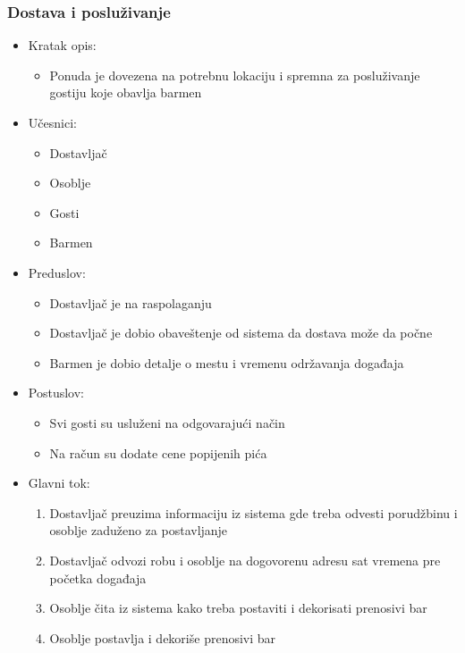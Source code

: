 \documentclass[a4paper]{article}
\begin{document}
\subsubsection{Dostava i posluživanje}

\begin{itemize}
    \item Kratak opis:
        \begin{itemize}
            \item Ponuda je dovezena na potrebnu lokaciju i spremna za posluživanje gostiju koje obavlja barmen
        \end{itemize}
    \item Učesnici:
        \begin{itemize}
            \item Dostavljač
            \item Osoblje
            \item Gosti
            \item Barmen 
        \end{itemize}
    \item Preduslov:
        \begin{itemize}
		    \item Dostavljač je na raspolaganju
		     \item Dostavljač je dobio obaveštenje od sistema da dostava može da počne
		    \item Barmen je dobio detalje o mestu i vremenu održavanja događaja
        \end{itemize}
    \item Postuslov:
        \begin{itemize}
            \item Svi gosti su usluženi na odgovarajući način
            \item Na račun su dodate cene popijenih pića
        \end{itemize}
    \item Glavni tok:
        \begin{enumerate}
            \item Dostavljač preuzima informaciju iz sistema gde treba odvesti porudžbinu i osoblje zaduženo za postavljanje
           \item Dostavljač odvozi robu i osoblje na dogovorenu adresu sat vremena pre početka događaja 
		    \item Osoblje čita iz sistema kako treba postaviti i dekorisati prenosivi bar 
		    \item Osoblje postavlja i dekoriše prenosivi bar

\end{enumerate}
\end{itemize}
\end{document}
